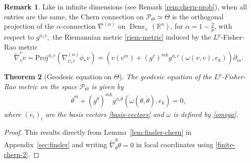 \documentclass[11pt]{amsart}
\newtheorem{theorem}{Theorem}[section]
\theoremstyle{definition}
\newtheorem{remark}[theorem]{Remark}
\newcommand{\R}{\mathbb R}
\newcommand{\DensRn}{\operatorname{Dens}_+(\R^n)}
\newcommand{\nablatilde}{\tilde{\nabla}}
\begin{document}
\begin{remark}
Like in infinite dimensions (see Remark \ref{rem:chern-prob}), when all entries are the same, the Chern connection on $\mathcal P_\Theta\simeq\Theta$ is the orthogonal projection of the $\alpha$-connection $\nabla^{(\alpha)}$ on $\DensRn$, for $\alpha=1-\frac{2}{p}$, with respect to $g^{\phi_*v},$ the Riemannian metric \eqref{riem-metric} induced by the $L^p$-Fisher-Rao metric
\begin{equation}\label{finite-chern-2}
\nablatilde^v_vv=\mathrm{Proj}^{\phi_*v}\left(\nabla^{(\alpha)}_{\psi_*v}\phi_*v\right)=\left(v(v^m) + (g^v)^{mk} g^{\phi_*v}(\omega(v,v),e_k)\right)\partial_m.
\end{equation}
\end{remark}
\begin{theorem}[Geodesic equation on $\Theta$]
The geodesic equation of the $L^p$-Fisher-Rao metric on the space $\mathcal P_\Theta$ is given by
\begin{align}\label{eq:geodesicTheta} 
\ddot\theta^m + (g^{\dot\theta})^{mk} g^{\phi_*\dot\theta}(\omega(\dot\theta,\dot\theta),e_k)=0,
\end{align}
where $(e_i)_i$ are the basis vectors \eqref{basis-vectors} and
$\omega$ is defined by \eqref{omega}.
\end{theorem}
\begin{proof}
This results directly from Lemma~\ref{lem:finsler-chern} in Appendix~\ref{sec:finsler} and writing $\nablatilde^{\dot\theta}_{\dot\theta}\dot\theta=0$ in local coordinates using \eqref{finite-chern-2}.
\end{proof}
\end{document}
